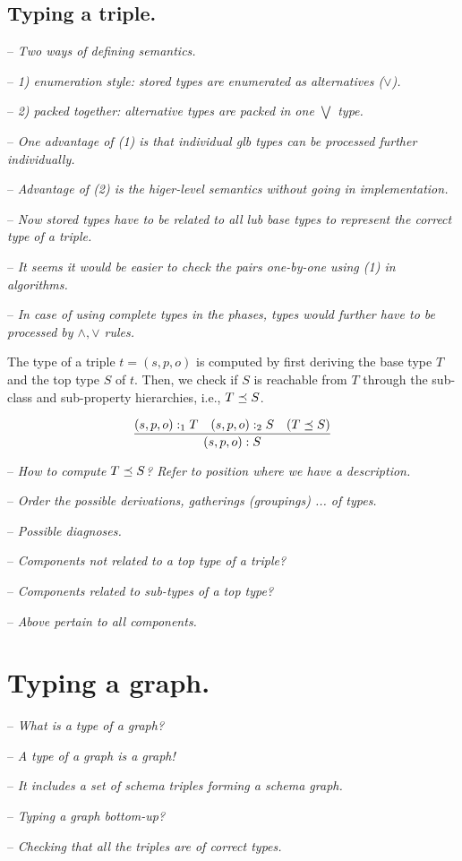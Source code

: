 \documentclass[runningheads]{llncs}
\newcommand{\nl}{\hfill\break}
\newcommand{\notes}[1]{\noindent\begin{small}-- \emph{#1}\\\end{small}}
\begin{document}
\subsection{Typing a triple.}\nl

\notes{Two ways of defining semantics.}
\notes{1) enumeration style: stored types are enumerated as alternatives ($\lor$).}
\notes{2) packed together: alternative types are packed in one $\bigvee$ type.}
\notes{One advantage of (1) is that individual glb types can be processed further individually.}
\notes{Advantage of (2) is the higer-level semantics without going in implementation.}

\notes{Now stored types have to be related to all lub base types to represent the correct type of a triple.}
\notes{It seems it would be easier to check the pairs one-by-one using (1) in algorithms.}
\notes{In case of using complete types in the phases, types would further have to be processed by $\land,\lor$ rules.}

The type of a triple $t=(s,p,o)$ is computed by first deriving the
base type $T$ and the top type $S$ of $t$. Then, we check if $S$ is
reachable from $T$ through the sub-class and sub-property hierarchies,
i.e., $T\preceq\/S$.

\begin{equation}
\dfrac{(s,p,o):_1T\quad (s,p,o):_2S\quad (T\preceq\/S)}
      {(s,p,o):S}
\end{equation}

\medskip

\medskip
\notes{How to compute $T\preceq\/S$? Refer to position where we have a description.}
\notes{Order the possible derivations, gatherings (groupings) ... of types.}

\notes{Possible diagnoses.}
\notes{Components not related to a top type of a triple?}
\notes{Components related to sub-types of a top type?}
\notes{Above pertain to all components.}





\section{Typing a graph.}\nl

\notes{What is a type of a graph?}
\notes{A type of a graph is a graph!}
\notes{It includes a set of schema triples forming a schema graph.}

\notes{Typing a graph bottom-up?}
\notes{Checking that all the triples are of correct types.}
\end{document}
